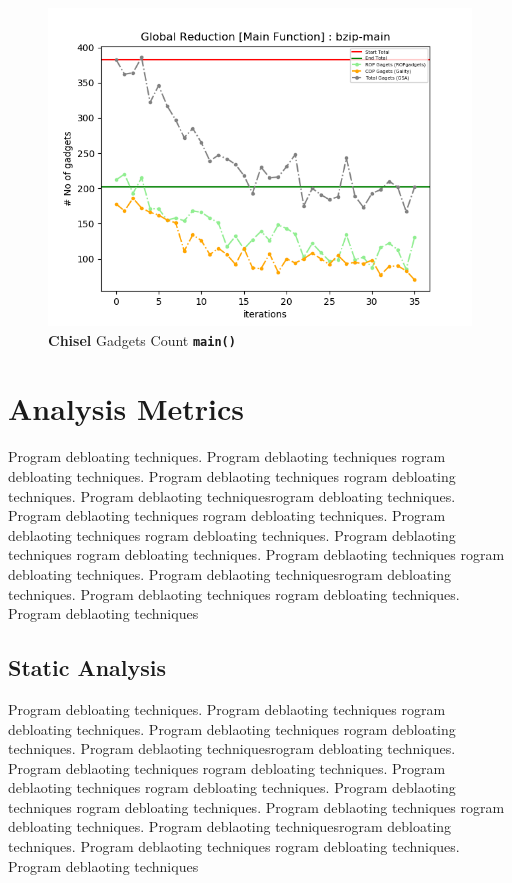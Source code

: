 \documentclass{relatorio}
\begin{document}
\begin{figure}[H]
	\includegraphics[width=1\linewidth]{imgs/plots/chisel_gadgets_bzip-main_plot.png}
	\caption{\textbf{Chisel} Gadgets Count \textbf{\texttt{main()}}}%
	\label{fig:plant}
\end{figure}

\section{Analysis Metrics}%
\label{Tools}

Program debloating techniques. Program deblaoting techniques rogram debloating techniques. Program deblaoting techniques
rogram debloating techniques. Program deblaoting techniquesrogram debloating techniques. Program deblaoting techniques
rogram debloating techniques. Program deblaoting techniques rogram debloating techniques. Program deblaoting techniques
rogram debloating techniques. Program deblaoting techniques 
rogram debloating techniques. Program deblaoting techniquesrogram debloating techniques. Program deblaoting techniques
rogram debloating techniques. Program deblaoting techniques

\subsection{Static Analysis}%
\label{Tools}

Program debloating techniques. Program deblaoting techniques rogram debloating techniques. Program deblaoting techniques
rogram debloating techniques. Program deblaoting techniquesrogram debloating techniques. Program deblaoting techniques
rogram debloating techniques. Program deblaoting techniques rogram debloating techniques. Program deblaoting techniques
rogram debloating techniques. Program deblaoting techniques 
rogram debloating techniques. Program deblaoting techniquesrogram debloating techniques. Program deblaoting techniques
rogram debloating techniques. Program deblaoting techniques
\end{document}
